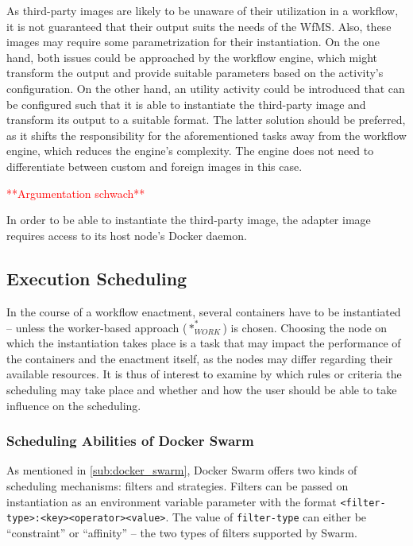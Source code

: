   As third-party images are likely to be unaware of their utilization in a workflow, it is not guaranteed that their output suits the needs of the \ac{WfMS}. Also, these images may require some parametrization for their instantiation. On the one hand, both issues could be approached by the workflow engine, which might transform the output and provide suitable parameters based on the activity's configuration. On the other hand, an utility activity could be introduced that can be configured such that it is able to instantiate the third-party image and transform its output to a suitable format.
  The latter solution should be preferred, as it shifts the responsibility for the aforementioned tasks away from the workflow engine, which reduces the engine's complexity. The engine does not need to differentiate between custom and foreign images in this case.

  \textcolor{red}{**Argumentation schwach**}

  In order to be able to instantiate the third-party image, the adapter image requires access to its host node's Docker daemon.


\subsection{Execution Scheduling} %
\label{sub:execution_scheduling}
  In the course of a workflow enactment, several containers have to be instantiated -- unless the worker-based approach ($*_{WORK}^{*}$) is chosen. Choosing the node on which the instantiation takes place is a task that may impact the performance of the containers and the enactment itself, as the nodes may differ regarding their available resources. It is thus of interest to examine by which rules or criteria the scheduling may take place and whether and how the user should be able to take influence on the scheduling.

  \subsubsection{Scheduling Abilities of Docker Swarm} %
    \label{ssub:abilities_of_docker_swarm}
    As mentioned in \ref{sub:docker_swarm}, Docker Swarm offers two kinds of scheduling mechanisms: filters and strategies. Filters can be passed on instantiation as an environment variable parameter with the format \texttt{<filter-type>:<key><operator><value>}. The value of \texttt{filter-type} can either be ``constraint'' or ``affinity'' -- the two types of filters supported by Swarm.

